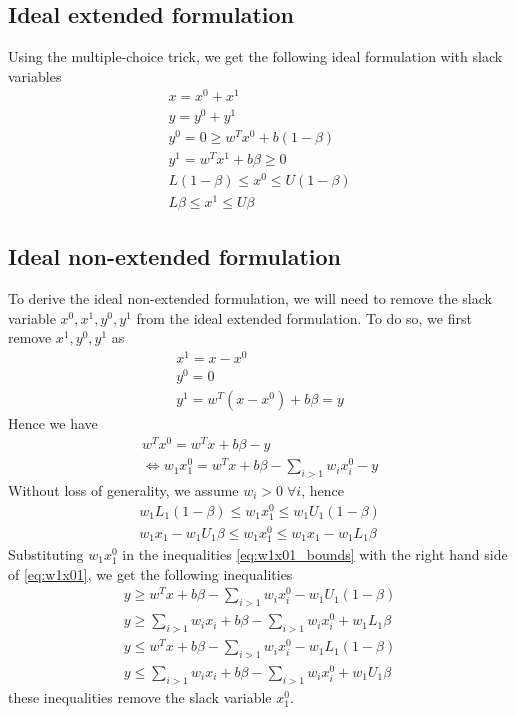 \documentclass{article}
\begin{document}
\subsection{Ideal extended formulation}
Using the multiple-choice trick, we get the following ideal formulation with slack variables
\begin{subequations}
\begin{align}
	x = x^0 + x^1\\
	y = y^0 + y^1\\
	y^0 = 0 \ge w^Tx^0 + b(1-\beta)\\
	y^1 = w^Tx^1 + b\beta\ge 0\\
	L(1-\beta)\le x^0\le U(1-\beta)\\
	L\beta\le x^1\le U\beta
\end{align}
\end{subequations}

\subsection{Ideal non-extended formulation}
To derive the ideal non-extended formulation, we will need to remove the slack variable $x^0, x^1, y^0, y^1$ from the ideal extended formulation. To do so, we first remove $x^1, y^0, y^1$ as
\begin{align}
	x^1 = x - x^0\\
	y^0 = 0\\
	y^1 = w^T(x-x^0) + b\beta = y
\end{align}
Hence we have
\begin{align}
	w^Tx^0 = w^Tx + b\beta-y\\
	\Leftrightarrow w_1x^0_1 = w^Tx + b\beta -\sum_{i>1}w_ix^0_i - y\label{eq:w1x01}
\end{align}
Without loss of generality, we assume $w_i > 0\; \forall i$, hence
\begin{subequations}
\begin{align}
	w_1L_1(1-\beta)\le w_1x^0_1\le w_1U_1(1-\beta)\\
	w_1x_1 - w_1U_1\beta \le w_1x^0_1 \le w_1x_1 - w_1L_1\beta
\end{align}
\label{eq:w1x01_bounds}
\end{subequations}
Substituting $w_1x^0_1$ in the inequalities \eqref{eq:w1x01_bounds} with the right hand side of \eqref{eq:w1x01}, we get the following inequalities
\begin{subequations}
	\begin{align}
		y \ge w^Tx + b\beta - \sum_{i>1}w_ix^0_i - w_1U_1(1-\beta)\\
		y \ge \sum_{i>1}w_ix_i + b\beta - \sum_{i>1}w_ix^0_i + w_1L_1\beta\\
		y \le w^Tx + b\beta - \sum_{i>1}w_ix^0_i - w_1L_1(1-\beta)\\
		y \le \sum_{i>1}w_ix_i + b\beta - \sum_{i>1}w_ix^0_i  + w_1U_1\beta
	\end{align}
\end{subequations}
these inequalities remove the slack variable $x^0_1$.
\end{document}
